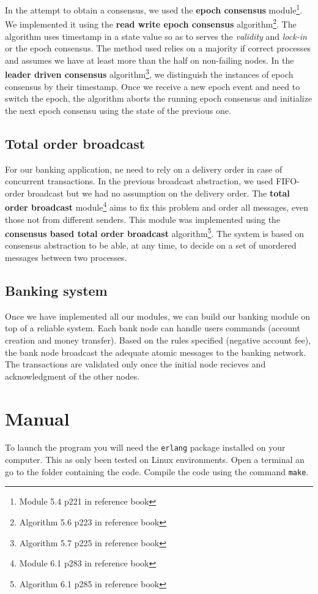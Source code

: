\documentclass[11pt,english,a4paper]{article}
\begin{document}
In the attempt to obtain a consensus, we used the \textbf{epoch consensus} module\footnote{Module 5.4 p221 in reference book}.
We implemented it using the \textbf{read write epoch consensus} algorithm\footnote{Algorithm 5.6 p223 in reference book}.
The algorithm uses timestamp in a state value so as to serves the \emph{validity} and \emph{lock-in} or the epoch consensus.
The method used relies on a majority if correct processes and assumes we have at least more than the half on non-failing nodes.
In the \textbf{leader driven consensus} algorithm\footnote{Algorithm 5.7 p225 in reference book}, we distinguish the instances of epoch consensus by their timestamp.
Once we receive a new epoch event and need to switch the epoch, the algorithm aborts the running epoch consensus and initialize the next epoch consensu using the state of the previous one.

\subsection*{Total order broadcast}
For our banking application, ne need to rely on a delivery order in case of concurrent transactions.
In the previous broadcast abstraction, we used FIFO-order broadcast but we had no assumption on the delivery order.
The \textbf{total order broadcast} module\footnote{Module 6.1 p283 in reference book} aims to fix this problem and order all messages, even those not from different senders.
This module was implemented using the \textbf{consensus based total order broadcast} algorithm\footnote{Algorithm 6.1 p285 in reference book}.
The system is based on consensus abstraction to be able, at any time, to decide on a set of unordered messages between two processes.

\subsection*{Banking system}
Once we have implemented all our modules, we can build our banking module on top of a reliable system.
Each bank node can handle users commands (account creation and money transfer).
Based on the rules specified (negative account fee), the bank node broadcast the adequate atomic messages to the banking network.
The transactions are validated only once the initial node recieves and acknowledgment of the other nodes.

\section{Manual}
To launch the program you will need the \texttt{erlang} package installed on your computer.
This as only been tested on Linux environments.
Open a terminal an go to the folder containing the code.
Compile the code using the command \texttt{make}.\\
\end{document}
